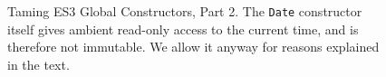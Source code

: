 \documentclass[letterpaper,twocolumn,10pt]{article}
\newcommand{\code}[1]{{\tt {#1}}}              %
\begin{document}
\begin{figure}
\begin{tabular}{lll}
\end{tabular}

\caption[Taming ES3 Global Constructors, Part 2.]{Taming ES3 Global
Constructors, Part 2. The \code{Date} constructor itself gives ambient
read-only access to the current time, and is therefore not immutable.
We allow it anyway for reasons explained in the text.} 

\label{tab:taming-es3-1}
\end{figure}







\end{document}
